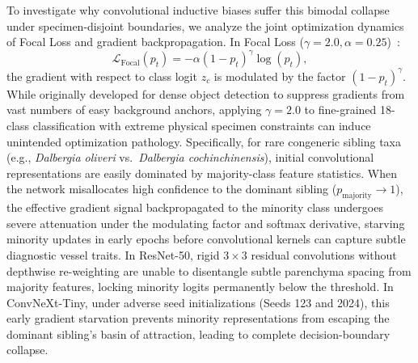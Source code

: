 \documentclass[a4paper,fleqn]{cas-sc}
\begin{document}
To investigate why convolutional inductive biases suffer this bimodal collapse under specimen-disjoint boundaries, we analyze the joint optimization dynamics of Focal Loss and gradient backpropagation. In Focal Loss ($\gamma=2.0, \alpha=0.25$)~\cite{focal}:
\begin{equation}
\mathcal{L}_{\text{Focal}}(p_t) = -\alpha (1 - p_t)^\gamma \log(p_t),
\end{equation}
the gradient with respect to class logit $z_c$ is modulated by the factor $(1 - p_t)^\gamma$. While originally developed for dense object detection to suppress gradients from vast numbers of easy background anchors, applying $\gamma=2.0$ to fine-grained 18-class classification with extreme physical specimen constraints can induce unintended optimization pathology. Specifically, for rare congeneric sibling taxa (e.g., \textit{Dalbergia oliveri} vs.\ \textit{Dalbergia cochinchinensis}), initial convolutional representations are easily dominated by majority-class feature statistics. When the network misallocates high confidence to the dominant sibling ($p_{\text{majority}} \to 1$), the effective gradient signal backpropagated to the minority class undergoes severe attenuation under the modulating factor and softmax derivative, starving minority updates in early epochs before convolutional kernels can capture subtle diagnostic vessel traits. In ResNet-50, rigid $3 \times 3$ residual convolutions without depthwise re-weighting are unable to disentangle subtle parenchyma spacing from majority features, locking minority logits permanently below the threshold. In ConvNeXt-Tiny, under adverse seed initializations (Seeds 123 and 2024), this early gradient starvation prevents minority representations from escaping the dominant sibling's basin of attraction, leading to complete decision-boundary collapse.
\end{document}
